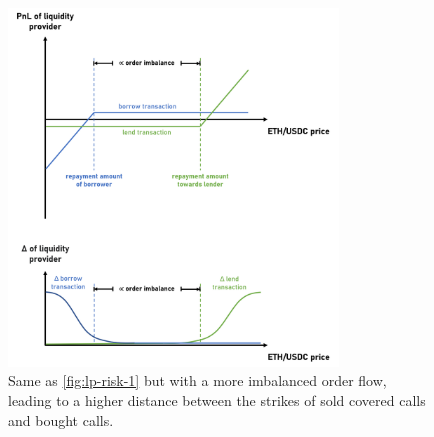 \documentclass[a4paper]{article}
\begin{document}
\begin{figure}[!ht]
    \centering
    \includegraphics[width=0.78\textwidth]{figures/lp-risk-2.png} 
    \cprotect\caption{\small Same as \cref{fig:lp-risk-1} but with a more imbalanced order flow, leading to a higher distance between the strikes of sold covered calls and bought calls.}
    \label{fig:lp-risk-2}
\end{figure}

\newpage


\end{document}
